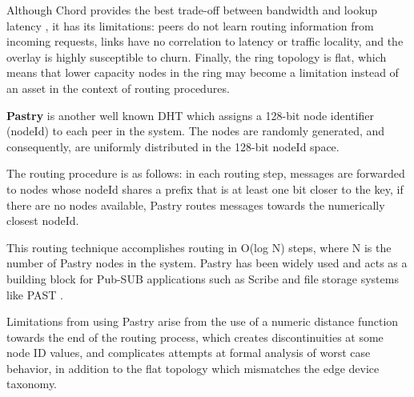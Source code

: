 Although Chord provides the best trade-off between bandwidth and lookup latency \cite{dht_performance_churn}, it has its limitations: peers do not learn routing information from incoming requests, links have no correlation to latency or traffic locality, and the overlay is highly susceptible to churn. Finally, the ring topology is flat, which means that lower capacity nodes in the ring may become a limitation instead of an asset in the context of routing procedures.





\textbf{Pastry} \cite{rowstron2001pastry} is another well known DHT which assigns a 128-bit node identifier (nodeId) to each peer in the system. The nodes are randomly generated, and consequently, are uniformly distributed in the 128-bit nodeId space. 

The routing procedure is as follows: in each routing step, messages are forwarded to nodes whose nodeId shares a prefix that is at least one bit closer to the key, if there are no nodes available, Pastry routes messages towards the numerically closest nodeId. 

This routing technique accomplishes routing in O(log N) steps, where N is the number of Pastry nodes in the system. Pastry has been widely used and acts as a building block for Pub-SUB applications such as Scribe \cite{10.1007/3-540-45546-9_3} and file storage systems like PAST \cite{990064}. 

Limitations from using Pastry arise from the use of a numeric distance function towards the end of the routing process, which creates discontinuities at some node ID values, and complicates attempts at formal analysis of worst case behavior, in addition to the flat topology which mismatches the edge device taxonomy.

